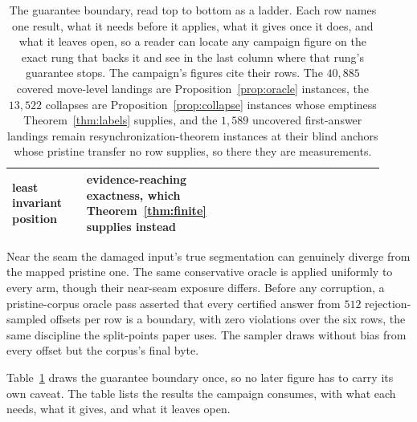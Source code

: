 \documentclass[11pt,a4paper]{article}
\theoremstyle{definition}
\theoremstyle{plain}
\theoremstyle{remark}
\begin{document}
\begin{table}[htbp]
\begin{tabular}{@{}>{\raggedright\arraybackslash}p{0.20\linewidth}p{0.27\linewidth}p{0.25\linewidth}p{0.20\linewidth}@{}}
least invariant position & evidence-reaching exactness, which Theorem~\ref{thm:finite} supplies instead \\
\bottomrule
\end{tabular}
\renewcommand{\arraystretch}{1.0}
\caption{The guarantee boundary, read top to bottom as a ladder. Each row names one result, what it needs before it
applies, what it gives once it does, and what it leaves open, so a reader can locate any campaign figure on the exact
rung that backs it and see in the last column where that rung's guarantee stops. The campaign's figures cite their rows.
The $40{,}885$ covered move-level landings are Proposition~\ref{prop:oracle} instances, the $13{,}522$ collapses are
Proposition~\ref{prop:collapse} instances whose emptiness Theorem~\ref{thm:labels} supplies, and the $1{,}589$ uncovered
first-answer landings remain resynchronization-theorem instances at their blind anchors whose pristine transfer no row
supplies, so there they are measurements.}
\label{tab:ladder}
\end{table}

Near the seam the damaged input's true segmentation can genuinely diverge from the mapped pristine one. The same
conservative oracle is applied uniformly to every arm, though their near-seam exposure differs. Before any corruption, a
pristine-corpus oracle pass asserted that every certified answer from $512$ rejection-sampled offsets per row is a
boundary, with zero violations over the six rows, the same discipline the split-points paper uses. The sampler draws
without bias from every offset but the corpus's final byte.

Table~\ref{tab:ladder} draws the guarantee boundary once, so no later figure has to carry its own caveat. The table
lists the results the campaign consumes, with what each needs, what it gives, and what it leaves open.
\end{document}
